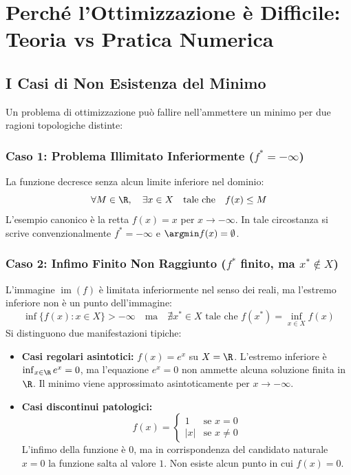 \FloatBarrier
\section{Perch\'e l'Ottimizzazione \`e Difficile: Teoria vs Pratica Numerica}
\label{sec:opt-difficolta-teoria-pratica}

\subsection{I Casi di Non Esistenza del Minimo}
Un problema di ottimizzazione pu\`o fallire nell'ammettere un minimo per due ragioni topologiche distinte:

\subsubsection{Caso 1: Problema Illimitato Inferiormente ($f^* = -\infty$)}
La funzione decresce senza alcun limite inferiore nel dominio:
\begin{equation}
\forall M \in \R, \quad \exists x \in X \quad \text{tale che} \quad f(x) \le M
\end{equation}
L'esempio canonico \`e la retta $f(x) = x$ per $x \to -\infty$. In tale circostanza si scrive convenzionalmente $f^* = -\infty$ e $\argmin f(x) = \emptyset$.

\subsubsection{Caso 2: Infimo Finito Non Raggiunto ($f^*$ finito, ma $x^* \notin X$)}
L'immagine $\operatorname{im}(f)$ \`e limitata inferiormente nel senso dei reali, ma l'estremo inferiore non \`e un punto dell'immagine:
\begin{equation}
\inf \{ f(x) : x \in X \} > -\infty \quad \text{ma} \quad \nexists x^* \in X \text{ tale che } f(x^*) = \inf_{x \in X} f(x)
\end{equation}
Si distinguono due manifestazioni tipiche:
\begin{itemize}
    \item \textbf{Casi regolari asintotici:} $f(x) = e^x$ su $X = \R$. L'estremo inferiore \`e $\inf_{x \in \R} e^x = 0$, ma l'equazione $e^x = 0$ non ammette alcuna soluzione finita in $\R$. Il minimo viene approssimato asintoticamente per $x \to -\infty$.
    \item \textbf{Casi discontinui patologici:}
    \begin{equation}
    f(x) = \begin{cases} 1 & \text{se } x = 0 \\ |x| & \text{se } x \neq 0 \end{cases}
    \end{equation}
    L'infimo della funzione \`e $0$, ma in corrispondenza del candidato naturale $x = 0$ la funzione salta al valore $1$. Non esiste alcun punto in cui $f(x) = 0$.
\end{itemize}

